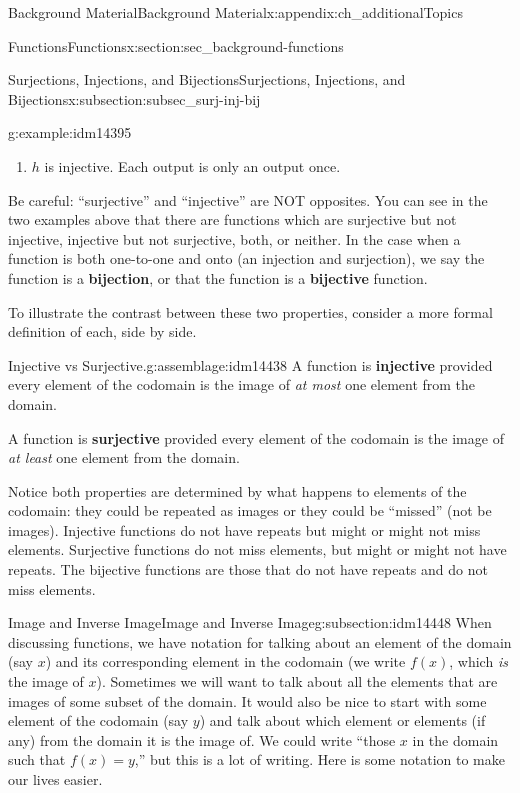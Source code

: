 \documentclass[oneside,10pt,]{book}
\newcommand{\terminology}[1]{\textbf{#1}}
\numberwithin{equation}{chapter}
\begin{document}
\begin{appendixptx}{Background Material}{}{Background Material}{}{}{x:appendix:ch_additionalTopics}
\begin{sectionptx}{Functions}{}{Functions}{}{}{x:section:sec_background-functions}
\begin{subsectionptx}{Surjections, Injections, and Bijections}{}{Surjections, Injections, and Bijections}{}{}{x:subsection:subsec_surj-inj-bij}
\begin{example}{}{g:example:idm14395}
\begin{enumerate}
\item{}\(h\) is injective. Each output is only an output once.%
\end{enumerate}
%
\end{example}
Be careful: ``surjective'' and ``injective'' are NOT opposites.  You can see in the two examples above that there are functions which are surjective but not injective, injective but not surjective, both, or neither. In the case when a function is both one-to-one and onto (an injection and surjection), we say the function is a \terminology{bijection}, or that the function is a \terminology{bijective} function.%
\par
To illustrate the contrast between these two properties, consider a more formal definition of each, side by side.%
\begin{assemblage}{Injective vs Surjective.}{g:assemblage:idm14438}%
A function is \terminology{injective} provided every element of the codomain is the image of \emph{at most} one element from the domain.%
\par
A function is \terminology{surjective} provided every element of the codomain is the image of \emph{at least} one element from the domain.%
\end{assemblage}
Notice both properties are determined by what happens to elements of the codomain: they could be repeated as images or they could be ``missed'' (not be images).  Injective functions do not have repeats but might or might not miss elements.  Surjective functions do not miss elements, but might or might not have repeats.  The bijective functions are those that do not have repeats and do not miss elements.%
\end{subsectionptx}
%
%
\typeout{************************************************}
\typeout{************************************************}
%
\begin{subsectionptx}{Image and Inverse Image}{}{Image and Inverse Image}{}{}{g:subsection:idm14448}
When discussing functions, we have notation for talking about an element of the domain (say \(x\)) and its corresponding element in the codomain (we write \(f(x)\), which \emph{is} the image of \(x\)). Sometimes we will want to talk about all the elements that are images of some subset of the domain.  It would also be nice to start with some element of the codomain (say \(y\)) and talk about which element or elements (if any) from the domain it is the image of. We could write ``those \(x\) in the domain such that \(f(x) = y\),'' but this is a lot of writing. Here is some notation to make our lives easier.%

\end{subsectionptx}
\end{sectionptx}
\end{appendixptx}
\end{document}
